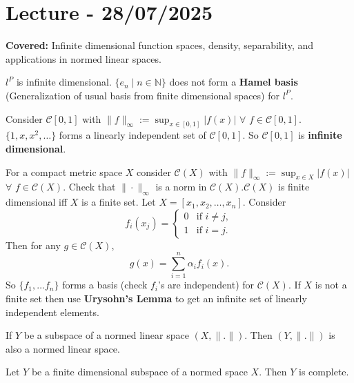\documentclass{functionspaces}
\begin{document}
\endgroup


\newpage
\section{Lecture - 28/07/2025}

\textbf{Covered:} Infinite dimensional function spaces, density, separability, and applications in normed linear spaces.

\begingroup
\setlength{\parskip}{6pt}
\setlength{\parindent}{0pt}

\begin{example}
$l^{P}$ is infinite dimensional. $\{e_{n} \mid n \in \mathbb{N}\}$ does not form a \textbf{Hamel basis} (Generalization of usual basis from finite dimensional spaces) for $l^{P}$.
\end{example}

\begin{example}
Consider $\mathcal{C}[0,1]$ with $\|f\|_{\infty} := \sup_{x\in[0,1]}|f(x)|$ $\forall$ $f \in \mathcal{C}[0,1]$. $\{1,x,x^{2},\ldots\}$ forms a linearly independent set of $\mathcal{C}[0,1]$. So $\mathcal{C}[0,1]$ is \textbf{infinite dimensional}.
\end{example}

\begin{example}
For a compact metric space $X$ consider $\mathcal{C}(X)$ with $\|f\|_{\infty} := \sup_{x\in X}|f(x)|$ $\forall$ $f \in \mathcal{C}(X)$. Check that $\|\cdot\|_{\infty}$ is a norm in $\mathcal{C}(X)$.$\mathcal{C}(X)$ is finite dimensional iff $X$ is a finite set. Let $X=[x_{1},x_{2},\ldots,x_{n}]$. Consider
\[
f_{i}(x_{j})=\begin{cases} 
0 & \text{if } i\neq j, \\ 
1 & \text{if } i=j.
\end{cases}
\]
Then for any $g \in \mathcal{C}(X)$,
\[
g(x)=\sum_{i=1}^{n}\alpha_{i}f_{i}(x).
\]
So $\{f_{1},\ldots f_{n}\}$ forms a basis (check $f_{i}$'s are independent) for $\mathcal{C}(X)$. If $X$ is not a finite set then use \textbf{Urysohn's Lemma} to get an infinite set of linearly independent elements.
\end{example}

\begin{lemma}
If $Y$ be a subspace of a normed linear space $(X,\|.\|)$. Then $(Y,\|.\|)$ is also a normed linear space.
\end{lemma}

\begin{proposition}
Let $Y$ be a finite dimensional subspace of a normed space $X$. Then $Y$ is complete.
\end{proposition}
\end{document}
